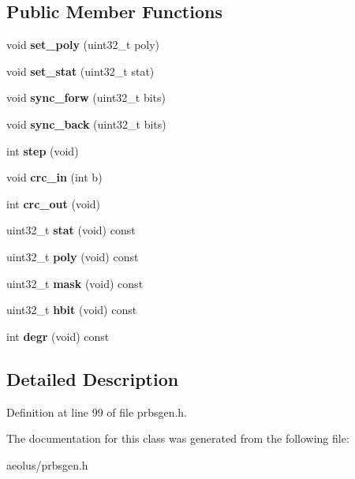 \subsection*{Public Member Functions}
\begin{DoxyCompactItemize}
\item 
\mbox{\label{class_prbsgen_a738b4604363bcf8b5231dcdaddacb270}} 
void {\bfseries set\+\_\+poly} (uint32\+\_\+t poly)
\item 
\mbox{\label{class_prbsgen_a758a16d2f7c19f546f115433cbe55519}} 
void {\bfseries set\+\_\+stat} (uint32\+\_\+t stat)
\item 
\mbox{\label{class_prbsgen_affae6691355819b639894abd396265d7}} 
void {\bfseries sync\+\_\+forw} (uint32\+\_\+t bits)
\item 
\mbox{\label{class_prbsgen_a67c2af0360b85e7f3001d62dde513b97}} 
void {\bfseries sync\+\_\+back} (uint32\+\_\+t bits)
\item 
\mbox{\label{class_prbsgen_a75a2f18dcaa96b30594c22ac6d6b540d}} 
int {\bfseries step} (void)
\item 
\mbox{\label{class_prbsgen_a0e15a5c4a01829ccbe46e6b516f4f147}} 
void {\bfseries crc\+\_\+in} (int b)
\item 
\mbox{\label{class_prbsgen_a87801bc509d7452758a23bac8c09d0da}} 
int {\bfseries crc\+\_\+out} (void)
\item 
\mbox{\label{class_prbsgen_a94831470d272f3dd20b492efe90fc063}} 
uint32\+\_\+t {\bfseries stat} (void) const
\item 
\mbox{\label{class_prbsgen_a89ee42650f39926a43a786ba0aa010f5}} 
uint32\+\_\+t {\bfseries poly} (void) const
\item 
\mbox{\label{class_prbsgen_a1111b9fbbb510cd29f76c51c4df042a7}} 
uint32\+\_\+t {\bfseries mask} (void) const
\item 
\mbox{\label{class_prbsgen_a91405a3b990eb9ed63e4c6864010b4cf}} 
uint32\+\_\+t {\bfseries hbit} (void) const
\item 
\mbox{\label{class_prbsgen_ae06181901c758742b766ec9910e6acfb}} 
int {\bfseries degr} (void) const
\end{DoxyCompactItemize}


\subsection{Detailed Description}


Definition at line 99 of file prbsgen.\+h.



The documentation for this class was generated from the following file\+:\begin{DoxyCompactItemize}
\item 
aeolus/prbsgen.\+h\end{DoxyCompactItemize}
